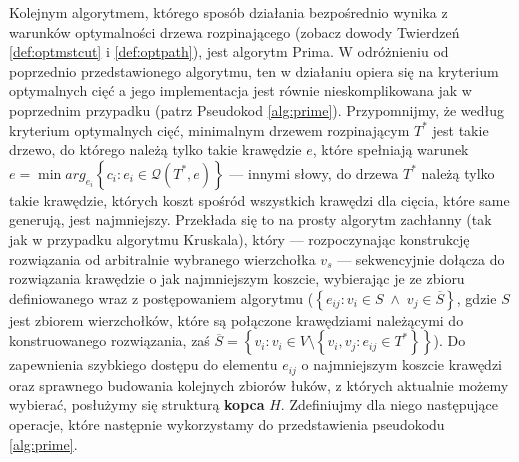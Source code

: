 Kolejnym algorytmem, którego sposób działania bezpośrednio wynika z warunków optymalności drzewa rozpinającego (zobacz dowody Twierdzeń \ref{def:optmstcut} i \ref{def:optpath}), jest algorytm Prima. W odróżnieniu od poprzednio przedstawionego algorytmu, ten w działaniu opiera się na kryterium optymalnych cięć a jego implementacja jest równie nieskomplikowana jak w poprzednim przypadku (patrz Pseudokod \ref{alg:prime}). Przypomnijmy, że według kryterium optymalnych cięć, minimalnym drzewem rozpinającym $T^{\ast}$ jest takie drzewo, do którego należą tylko takie krawędzie $e$, które spełniają warunek $e = \min arg_{e_{i}} \left\{ c_{i} : e_{i} \in \mathcal{Q} \left( T^{\ast}, e \right) \right\}$ --- innymi słowy, do drzewa $T^{\ast}$ należą tylko takie krawędzie, których koszt spośród wszystkich krawędzi dla cięcia, które same generują, jest najmniejszy. Przekłada się to na prosty algorytm zachłanny (tak jak w przypadku algorytmu Kruskala), który --- rozpoczynając konstrukcję rozwiązania od arbitralnie wybranego wierzchołka $v_{s}$ --- sekwencyjnie dołącza do rozwiązania krawędzie o jak najmniejszym koszcie, wybierając je ze zbioru definiowanego wraz z postępowaniem algorytmu ($\left\{ e_{ij} : v_{i} \in S \; \wedge \; v_{j} \in \overline{S} \right\}$, gdzie $S$ jest zbiorem wierzchołków, które są połączone krawędziami należącymi do konstruowanego rozwiązania, zaś $\overline{S} = \left\{ v_{i} : v_{i} \in V \setminus \left\{ v_{i}, v_{j} : e_{ij} \in T^{\ast} \right\} \right\}$). Do zapewnienia szybkiego dostępu do elementu $e_{ij}$ o najmniejszym koszcie krawędzi oraz sprawnego budowania kolejnych zbiorów łuków, z których aktualnie możemy wybierać, posłużymy się strukturą \textbf{kopca} $H$. Zdefiniujmy dla niego następujące operacje, które następnie wykorzystamy do przedstawienia pseudokodu \ref{alg:prime}.

